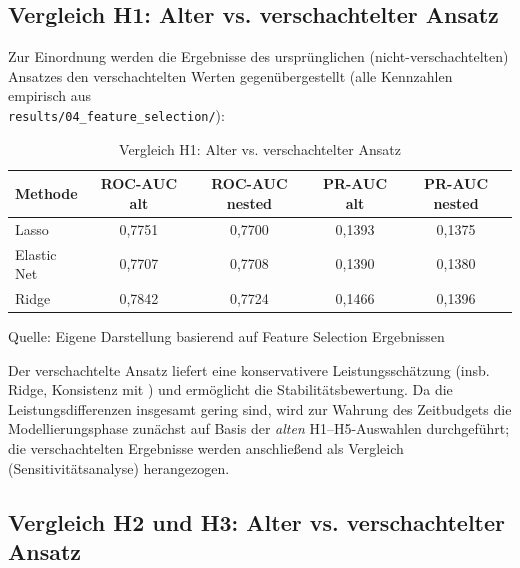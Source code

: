 \subsection*{Vergleich H1: Alter vs. verschachtelter Ansatz}
Zur Einordnung werden die Ergebnisse des ursprünglichen (nicht-verschachtelten) Ansatzes den verschachtelten Werten gegenübergestellt (alle Kennzahlen empirisch aus \\
\texttt{results/04\_feature\_selection/}):

\begin{table}[htbp]
\centering
\caption{Vergleich H1: Alter vs. verschachtelter Ansatz}
\label{tab:h1_comparison}
\begin{tabular}{lcccc}
\toprule
\textbf{Methode} & \textbf{ROC-AUC alt} & \textbf{ROC-AUC nested} & \textbf{PR-AUC alt} & \textbf{PR-AUC nested} \\
\midrule
Lasso & 0{,}7751 & 0{,}7700 & 0{,}1393 & 0{,}1375 \\
Elastic Net & 0{,}7707 & 0{,}7708 & 0{,}1390 & 0{,}1380 \\
Ridge & 0{,}7842 & 0{,}7724 & 0{,}1466 & 0{,}1396 \\
\bottomrule
\end{tabular}
\par\smallskip
{\footnotesize Quelle: Eigene Darstellung basierend auf Feature Selection Ergebnissen}
\end{table}

Der verschachtelte Ansatz liefert eine konservativere Leistungsschätzung (insb. Ridge, Konsistenz mit \parencite{cawley2010overfitting,varma2006bias}) und ermöglicht die Stabilitätsbewertung. Da die Leistungsdifferenzen insgesamt gering sind, wird zur Wahrung des Zeitbudgets die Modellierungsphase zunächst auf Basis der \emph{alten} H1–H5-Auswahlen durchgeführt; die verschachtelten Ergebnisse werden anschließend als Vergleich (Sensitivitätsanalyse) herangezogen.

\subsection*{Vergleich H2 und H3: Alter vs. verschachtelter Ansatz}
